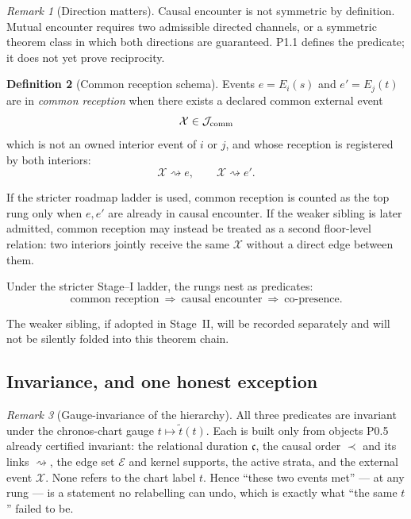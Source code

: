 \documentclass[11pt,a4paper]{article}
\theoremstyle{definition}
\newtheorem{definition}{Definition}[section]
\theoremstyle{plain}
\theoremstyle{remark}
\newtheorem{remark}[definition]{Remark}
\begin{document}
\begin{remark}[Direction matters]
Causal encounter is not symmetric by definition. Mutual encounter requires two
admissible directed channels, or a symmetric theorem class in which both
directions are guaranteed. P1.1 defines the predicate; it does not yet prove
reciprocity.
\end{remark}

\begin{definition}[Common reception schema]\label{def:comrec}
Events \(e=E_i(s)\) and \(e'=E_j(t)\) are in \emph{common reception} when there
exists a declared common external event
\[
\mathcal X\in\mathcal J_{\rm comm}
\]
which is not an owned interior event of \(i\) or \(j\), and whose reception is
registered by both interiors:
\[
\mathcal X\rightsquigarrow e,
\qquad
\mathcal X\rightsquigarrow e'.
\]

If the stricter roadmap ladder is used, common reception is counted as the top
rung only when \(e,e'\) are already in causal encounter. If the weaker sibling is
later admitted, common reception may instead be treated as a second floor-level
relation: two interiors jointly receive the same \(\mathcal X\) without a direct
edge between them.
\end{definition}

Under the stricter Stage--I ladder, the rungs nest as predicates:
\[
\boxed{\;
\text{common reception}\ \Longrightarrow\ \text{causal encounter}\ \Longrightarrow\ \text{co-presence}.
\;}
\]

The weaker sibling, if adopted in Stage~II, will be recorded separately and will not
be silently folded into this theorem chain.

\subsection{Invariance, and one honest exception}

\begin{remark}[Gauge-invariance of the hierarchy]
All three predicates are invariant under the chronos-chart gauge \(t\mapsto\widetilde t(t)\).
Each is built only from objects P0.5 already certified invariant: the relational duration
\(\mathfrak c\), the causal order \(\prec\) and its links \(\rightsquigarrow\), the edge set
\(\mathcal E\) and kernel supports, the active strata, and the external event \(\mathcal X\).
None refers to the chart label \(t\). Hence ``these two events met'' --- at any rung --- is
a statement no relabelling can undo, which is exactly what ``the same \(t\)'' failed to be.
\end{remark}
\end{document}
